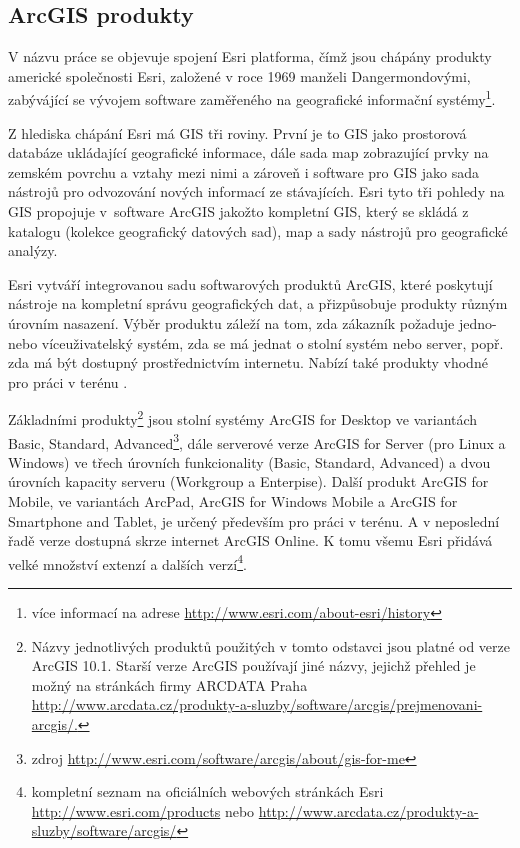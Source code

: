 
\subsection{ArcGIS produkty}

V názvu práce se objevuje spojení Esri platforma, čímž jsou chápány produkty americké společnosti Esri, založené v roce 1969 manželi Dangermondovými, zabývájící se vývojem software zaměřeného na geografické informační systémy\footnote{více informací na adrese \url{http://www.esri.com/about-esri/history}}.

Z hlediska chápání Esri má GIS tři roviny. První je to GIS jako prostorová databáze ukládající geografické informace, dále sada map zobrazující prvky na zemském povrchu a vztahy mezi nimi a zároveň i software pro GIS jako sada nástrojů pro odvozování nových informací ze stávajících. Esri tyto tři pohledy na GIS propojuje v~software ArcGIS jakožto kompletní GIS, který se skládá z katalogu (kolekce geografický datových sad), map a sady nástrojů pro geografické analýzy.

Esri vytváří integrovanou sadu softwarových produktů ArcGIS, které poskytují nástroje na kompletní správu geografických dat, a přizpůsobuje produkty různým úrovním nasazení. Výběr produktu záleží na tom, zda zákazník požaduje jedno- nebo víceuživatelský systém, zda se má jednat o stolní systém nebo server, popř. zda má být dostupný prostřednictvím internetu. Nabízí také produkty vhodné pro práci v terénu \citep{Esri2006}.

Základními produkty\footnote{Názvy jednotlivých produktů použitých v tomto odstavci jsou platné od verze ArcGIS 10.1. Starší verze ArcGIS používají jiné názvy, jejichž přehled je možný na stránkách firmy ARCDATA Praha \url{http://www.arcdata.cz/produkty-a-sluzby/software/arcgis/prejmenovani-arcgis/.}} jsou stolní systémy ArcGIS for Desktop ve variantách Basic, Standard, Advanced\footnote{zdroj \url{http://www.esri.com/software/arcgis/about/gis-for-me}}, dále serverové verze ArcGIS for Server (pro Linux a Windows) ve třech úrovních funkcionality (Basic, Standard, Advanced) a dvou úrovních kapacity serveru (Workgroup a Enterpise). Další produkt ArcGIS for Mobile, ve variantách ArcPad, ArcGIS for Windows Mobile a ArcGIS for Smartphone and Tablet, je určený především pro práci v terénu. A v neposlední řadě verze dostupná skrze internet ArcGIS Online. K tomu všemu Esri přidává velké množství extenzí a dalších verzí\footnote{kompletní seznam na oficiálních webových stránkách Esri \url{http://www.esri.com/products} nebo \url{http://www.arcdata.cz/produkty-a-sluzby/software/arcgis/}}.

